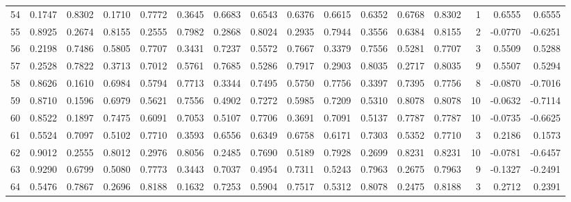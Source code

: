 \begin{tabular}{lrrrrrrrrrrrrrrr}
54  &      0.1747 &  0.8302 &  0.1710 &  0.7772 &  0.3645 &  0.6683 &  0.6543 &  0.6376 &  0.6615 &  0.6352 &   0.6768 &     0.8302 &      1 &                    0.6555 &                     0.6555 \\
55  &      0.8925 &  0.2674 &  0.8155 &  0.2555 &  0.7982 &  0.2868 &  0.8024 &  0.2935 &  0.7944 &  0.3556 &   0.6384 &     0.8155 &      2 &                   -0.0770 &                    -0.6251 \\
56  &      0.2198 &  0.7486 &  0.5805 &  0.7707 &  0.3431 &  0.7237 &  0.5572 &  0.7667 &  0.3379 &  0.7556 &   0.5281 &     0.7707 &      3 &                    0.5509 &                     0.5288 \\
57  &      0.2528 &  0.7822 &  0.3713 &  0.7012 &  0.5761 &  0.7685 &  0.5286 &  0.7917 &  0.2903 &  0.8035 &   0.2717 &     0.8035 &      9 &                    0.5507 &                     0.5294 \\
58  &      0.8626 &  0.1610 &  0.6984 &  0.5794 &  0.7713 &  0.3344 &  0.7495 &  0.5750 &  0.7756 &  0.3397 &   0.7395 &     0.7756 &      8 &                   -0.0870 &                    -0.7016 \\
59  &      0.8710 &  0.1596 &  0.6979 &  0.5621 &  0.7556 &  0.4902 &  0.7272 &  0.5985 &  0.7209 &  0.5310 &   0.8078 &     0.8078 &     10 &                   -0.0632 &                    -0.7114 \\
60  &      0.8522 &  0.1897 &  0.7475 &  0.6091 &  0.7053 &  0.5107 &  0.7706 &  0.3691 &  0.7091 &  0.5137 &   0.7787 &     0.7787 &     10 &                   -0.0735 &                    -0.6625 \\
61  &      0.5524 &  0.7097 &  0.5102 &  0.7710 &  0.3593 &  0.6556 &  0.6349 &  0.6758 &  0.6171 &  0.7303 &   0.5352 &     0.7710 &      3 &                    0.2186 &                     0.1573 \\
62  &      0.9012 &  0.2555 &  0.8012 &  0.2976 &  0.8056 &  0.2485 &  0.7690 &  0.5189 &  0.7928 &  0.2699 &   0.8231 &     0.8231 &     10 &                   -0.0781 &                    -0.6457 \\
63  &      0.9290 &  0.6799 &  0.5080 &  0.7773 &  0.3443 &  0.7037 &  0.4954 &  0.7311 &  0.5243 &  0.7963 &   0.2675 &     0.7963 &      9 &                   -0.1327 &                    -0.2491 \\
64  &      0.5476 &  0.7867 &  0.2696 &  0.8188 &  0.1632 &  0.7253 &  0.5904 &  0.7517 &  0.5312 &  0.8078 &   0.2475 &     0.8188 &      3 &                    0.2712 &                     0.2391 \\

\end{tabular}
